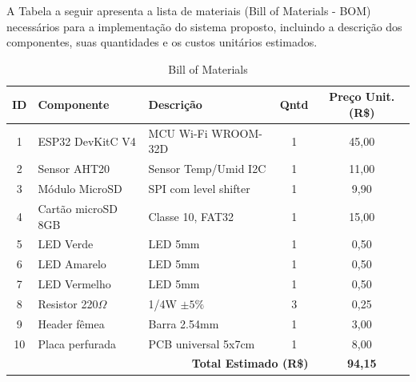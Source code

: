 
A Tabela a seguir apresenta a lista de materiais (Bill of Materials - BOM) necessários para a implementação do sistema proposto, incluindo a descrição dos componentes, suas quantidades e os custos unitários estimados.
\begin{table}[h]
\centering
\vspace{0.2cm}
\begin{tabular}{|c|l|l|c|c|}
\hline
\textbf{ID} & \textbf{Componente} & \textbf{Descrição} & \textbf{Qntd} & \textbf{Preço Unit. (R\$)} \\ 
\hline
1  & ESP32 DevKitC V4     & MCU Wi-Fi WROOM-32D   & 1 & 45,00  \\ \hline
2  & Sensor AHT20         & Sensor Temp/Umid I2C  & 1 & 11,00  \\ \hline
3  & Módulo MicroSD       & SPI com level shifter & 1 & 9,90   \\ \hline
4  & Cartão microSD 8GB   & Classe 10, FAT32      & 1 & 15,00  \\ \hline
5  & LED Verde            & LED 5mm               & 1 & 0,50   \\ \hline
6  & LED Amarelo          & LED 5mm               & 1 & 0,50   \\ \hline
7  & LED Vermelho         & LED 5mm               & 1 & 0,50   \\ \hline
8  & Resistor 220$\Omega$ & 1/4W $\pm5\%$         & 3 & 0,25   \\ \hline
9  & Header fêmea         & Barra 2.54mm          & 1 & 3,00   \\ \hline
10 & Placa perfurada      & PCB universal 5x7cm   & 1 & 8,00   \\ \hline
\multicolumn{4}{|r|}{\textbf{Total Estimado (R\$)}} & \textbf{94,15} \\
\hline
\end{tabular}
\caption{Bill of Materials}
\end{table}
